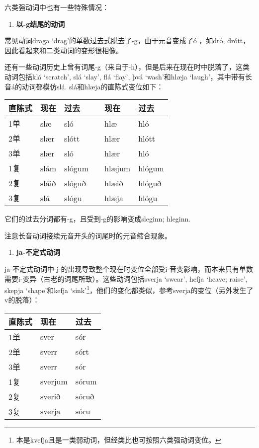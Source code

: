 六类强动词中也有一些特殊情况：

\begin{enumerate}
  \def\labelenumi{\arabic{enumi})}
  \item
        \textbf{以-g结尾的动词}
\end{enumerate}

常见动词draga `drag‌'的单数过去式脱去了-g，由于元音变成了ó ，如dró,
drótt，因此看起来和二类动词的变形很相像。

还有一些动词历史上曾有词尾-g（来自于-h），但是后来在现在时中脱落了，这类动词包括klá
`scratch', slá `slay', flá `flay', þvá `wash'和hlæja
`laugh‌'，其中带有长音á的动词都模仿slá. slá和hlæja的直陈式变位如下：

\begin{longtable}{llllll}
  \toprule
  直陈式 & 现在  & 过去   &  & 现在   & 过去   \\
  \midrule
  \endhead
  \bottomrule
  \endfoot
  1单    & slæ   & sló    &  & hlæ    & hló    \\
  2单    & slær  & slótt  &  & hlær   & hlótt  \\
  3单    & slær  & sló    &  & hlær   & hló    \\
  1复    & slám  & slógum &  & hlæjum & hlógum \\
  2复    & sláið & slóguð &  & hlæið  & hlóguð \\
  3复    & slá   & slógu  &  & hlæja  & hlógu  \\
\end{longtable}

它们的过去分词都有-g，且受到-g的影响变成sleginn; hleginn.

注意长音动词接续元音开头的词尾时的元音缩合现象。

\begin{enumerate}
  \def\labelenumi{\arabic{enumi})}
  \setcounter{enumi}{1}
  \item
        \textbf{ja-不定式动词}
\end{enumerate}

ja-不定式动词中-j-的出现导致整个现在时变位全部受i-音变影响，而本来只有单数需要i-变异（古老的词尾所致）。这些动词包括sverja
`swear', hefja `heave; raise', skepja `shape'和kefja
`sink'\footnote{本是kvefja且是一类弱动词，但经类比也可按照六类强动词变位。}，他们的变化都类似，参考sverja的变位（另外发生了v的脱落）：

\begin{longtable}{lll}
  \toprule
  直陈式 & 现在    & 过去  \\
  \midrule
  \endhead
  \bottomrule
  \endfoot
  1单    & sver    & sór   \\
  2单    & sverr   & sórt  \\
  3单    & sverr   & sór   \\
  1复    & sverjum & sórum \\
  2复    & sverið  & sóruð \\
  3复    & sverja  & sóru  \\
\end{longtable}


